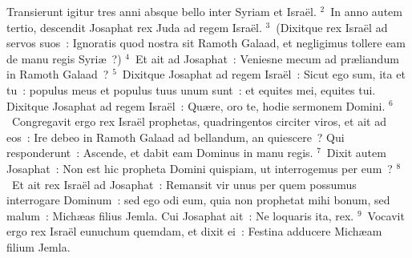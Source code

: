 \lettrine[lines=10,image=true,loversize=0.05,lraise=-0.03]{T}{}ransierunt igitur tres anni absque bello inter Syriam et Isra\"el.
${}^{2}$~In anno autem tertio, descendit Josaphat rex Juda ad regem Isra\"el.
${}^{3}$~(Dixitque rex Isra\"el ad servos suos~: Ignoratis quod nostra sit Ramoth Galaad, et negligimus tollere eam de manu regis Syri\ae~?)
${}^{4}$~Et ait ad Josaphat~: Veniesne mecum ad pr\ae liandum in Ramoth Galaad~?
${}^{5}$~Dixitque Josaphat ad regem Isra\"el~: Sicut ego sum, ita et tu~: populus meus et populus tuus unum sunt~: et equites mei, equites tui. Dixitque Josaphat ad regem Isra\"el~: Qu\ae re, oro te, hodie sermonem Domini.
${}^{6}$~Congregavit ergo rex Isra\"el prophetas, quadringentos circiter viros, et ait ad eos~: Ire debeo in Ramoth Galaad ad bellandum, an quiescere~? Qui responderunt~: Ascende, et dabit eam Dominus in manu regis.
${}^{7}$~Dixit autem Josaphat~: Non est hic propheta Domini quispiam, ut interrogemus per eum~?
${}^{8}$~Et ait rex Isra\"el ad Josaphat~: Remansit vir unus per quem possumus interrogare Dominum~: sed ego odi eum, quia non prophetat mihi bonum, sed malum~: Mich\ae as filius Jemla. Cui Josaphat ait~: Ne loquaris ita, rex.
${}^{9}$~Vocavit ergo rex Isra\"el eunuchum quemdam, et dixit ei~: Festina adducere Mich\ae am filium Jemla.


